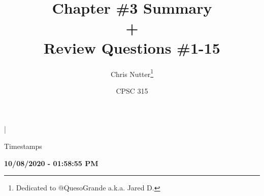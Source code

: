 \documentclass[12pt]{article}
\title{Chapter \#3 Summary\\\Large+\\ Review Questions \#1-15}
\author{Chris Nutter\thanks{Dedicated to @QuesoGrande a.k.a. Jared D.}}
\date{CPSC 315}
\renewcommand{\abstractname}{\small{\begin{center}Timestamps\end{center}\vspace{-4ex}}}
\begin{document}
\maketitle

\begin{center} \vspace{-4ex}|\vspace{-3ex} \end{center}

\noindent\abstractname
\begin{center}
    \normalsize\textbf{10/08/2020 - 01:58:55 PM}\\
\end{center}
\normalsize

\tableofcontents    
\vspace{4ex}

\end{document}
